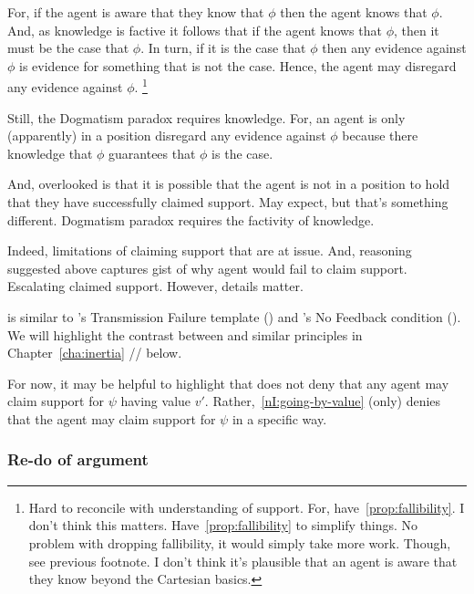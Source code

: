 \begin{note}
  For, if the agent is aware that they know that \(\phi\) then the agent knows that \(\phi\).
  And, as knowledge is factive it follows that if the agent knows that \(\phi\), then it must be the case that \(\phi\).
  In turn, if it is the case that \(\phi\) then any evidence against \(\phi\) is evidence for something that is not the case.
  Hence, the agent may disregard any evidence against \(\phi\).\nolinebreak
  \footnote{
    Hard to reconcile with understanding of support.
    For, have~\ref{prop:fallibility}.
    I don't think this matters.
    Have~\ref{prop:fallibility} to simplify things.
    No problem with dropping fallibility, it would simply take more work.
    Though, see previous footnote.
    I don't think it's plausible that an agent is aware that they know beyond the Cartesian basics.
  }

  Still, the Dogmatism paradox requires knowledge.
  For, an agent is only (apparently) in a position disregard any evidence against \(\phi\) because there knowledge that \(\phi\) guarantees that \(\phi\) is the case.

  And, overlooked is that it is possible that the agent is not in a position to hold that they have successfully claimed support.
  May expect, but that's something different.
  Dogmatism paradox requires the factivity of knowledge.

  Indeed, limitations of claiming support that are at issue.
  And, reasoning suggested above captures gist of why agent would fail to claim support.
  Escalating claimed support.
  However, details matter.
\end{note}

\begin{note}[Literature]
  \nI{} is similar to \citeauthor{Wright:2011wn}'s Transmission Failure template (\Citeyear{Wright:2003aa,Wright:2011wn}) and \citeauthor{Weisberg:2010to}'s No Feedback condition (\Citeyear{Weisberg:2010to}).
  {
    \color{red}
    We will highlight the contrast between \nI{} and similar principles in Chapter~\ref{cha:inertia} // below.
    }

  For now, it may be helpful to highlight that \nI{} does not deny that any agent may claim support for \(\psi\) having value \(v'\).
  Rather,~\ref{nI:going-by-value} (only) denies that the agent may claim support for \(\psi\) in a specific way.
\end{note}

\newpage

\subsubsection{Re-do of \nI{} argument}
\label{sec:re-do-ni}


